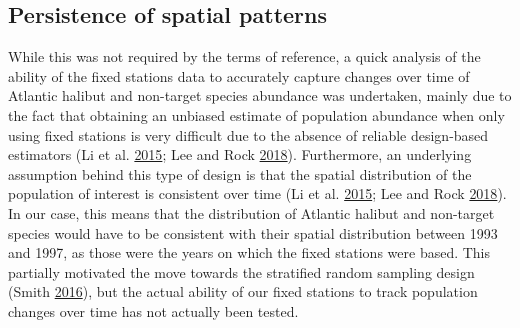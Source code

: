 \documentclass[12pt]{article}\usepackage[]{graphicx}\usepackage[]{color}
\begin{document}
\hypertarget{persistence-of-spatial-patterns}{%
\subsection{Persistence of spatial patterns}\label{persistence-of-spatial-patterns}}

While this was not required by the terms of reference, a quick analysis of the ability of the fixed stations data to accurately capture changes over time of Atlantic halibut and non-target species abundance was undertaken, mainly due to the fact that obtaining an unbiased estimate of population abundance when only using fixed stations is very difficult due to the absence of reliable design-based estimators (Li et al. \protect\hyperlink{ref-Li2015}{2015}; Lee and Rock \protect\hyperlink{ref-Lee2018}{2018}). Furthermore, an underlying assumption behind this type of design is that the spatial distribution of the population of interest is consistent over time (Li et al. \protect\hyperlink{ref-Li2015}{2015}; Lee and Rock \protect\hyperlink{ref-Lee2018}{2018}). In our case, this means that the distribution of Atlantic halibut and non-target species would have to be consistent with their spatial distribution between 1993 and 1997, as those were the years on which the fixed stations were based. This partially motivated the move towards the stratified random sampling design (Smith \protect\hyperlink{ref-Smith2016a}{2016}), but the actual ability of our fixed stations to track population changes over time has not actually been tested.
\end{document}
